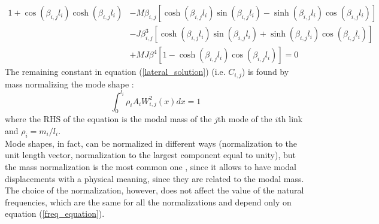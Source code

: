 \documentclass[a4paper,12pt,oneside]{report}
\begin{document}
\begin{equation}
  \begin{split}
  1+\cos{(\beta_{i,j}l_i)}\cosh{(\beta_{i,j}l_i)}&-M\beta_{i,j}[\cosh{(\beta_{i,j}l_i)}\sin{(\beta_{i,j}l_i)}-\sinh{(\beta_{i,j}l_i)}\cos{(\beta_{i,j}l_i)}]\\
  &-J\beta_{i,j}^3[\cosh{(\beta_{i,j}l_i)}\sin{(\beta_{i,j}l_i)}+\sinh{(\beta_{i,j}l_i)}\cos{(\beta_{i,j}l_i)}]\\
  &+MJ\beta^4[1-\cosh{(\beta_{i,j}l_i)}\cos{(\beta_{i,j}l_i)}]=0
  \end{split}
  \label{freq_equation}
\end{equation}
The remaining constant in equation (\ref{lateral_solution}) (i.e. $C_{i,j}$) is found by mass normalizing the mode shape \cite{nineteen,twenty}:
\begin{equation}
  \int_{0}^{l_i}\rho_i A_i W_{i,j}^2(x)dx=1
\end{equation}
where the RHS of the equation is the modal mass of the $j$th mode of the $i$th link and $\rho_i=m_i/l_i$.\\
Mode shapes, in fact, can be normalized in different ways (normalization to the unit length vector, normalization to the largest component equal to unity), but the mass normalization is the most common one \cite{nineteen,twenty}, since it allows to have modal displacements with a physical meaning, since they are related to the modal mass.\\
The choice of the normalization, however, does not affect the value of the natural frequencies, which are the same for all the normalizations and depend only on equation (\ref{freq_equation}).\\
\end{document}
